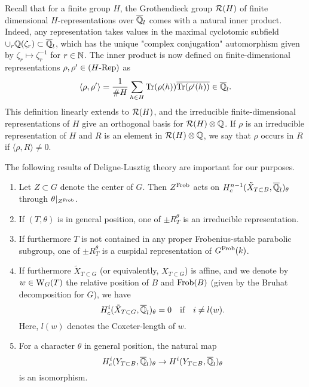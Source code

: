 \documentclass[../main.tex]{subfiles}
\begin{document}
Recall that for a finite group $H$, the Grothendieck group $\mathcal{R}(H)$ of finite 
dimensional $H$-representations over $\overline {\mathbb{Q}}_l$ comes with a natural inner
product. Indeed, any representation takes values in the maximal cyclotomic
subfield $\cup_{r} \mathbb{Q}(\zeta_r) \subset \overline {\mathbb{Q}}_l$, which has the unique 
"complex conjugation" automorphism given by $\zeta_r \mapsto \zeta_r^{-1}$ for 
$r \in \mathbb{N}$. 
The inner product is now defined on finite-dimensional representations $\rho,
\rho' \in {({H}\text-\allowbreak\mathrm{Rep})}$ as
\begin{equation*}
  \langle \rho, \rho' \rangle = \frac 1 {\# H} \sum_{h \in H} \operatorname{Tr}(\rho(h)) \overline {\operatorname{Tr} (\rho'(h))} \in \overline {\mathbb{Q}}_l.
\end{equation*}
This definition linearly extends to $\mathcal{R}(H)$, and the irreducible
finite-dimensional representations of $H$ give an orthogonal basis for $\mathcal{R}(H)
\otimes \mathbb{Q}$. If $\rho$ is an irreducible representation of $H$ and 
$R$ is an element in $\mathcal{R}(H) \otimes \mathbb{Q}$, we say that $\rho$ occurs in $R$ if 
$\langle \rho, R\rangle \neq 0$.

The following results of Deligne-Lusztig theory are important for our purposes.

\begin{thm}\label{thm:DLTheoryGeneralResults}
  \leavevmode
  \begin{enumerate}
      \item \textnormal{\cite[Corollary 1.22]{delignelusztig1976}} Let $Z \subset G$
        denote the center of $G$. Then $Z^{\mathrm{Frob}}$ acts on $H^{n-1}_c(\tilde
        X_{T \subset B}, \overline {\mathbb{Q}}_l)_{\theta}$ through $\theta|_{Z^{\mathrm{Frob}}}$.
      \item \textnormal{\cite[Corollary 7.3]{delignelusztig1976}} If 
        $(T, \theta)$ is in general position, one of $\pm R_T^\theta$ is an 
        irreducible representation.
      \item \textnormal{\cite[Corollary 8.3]{delignelusztig1976}} If furthermore
        $T$ is not contained in any proper Frobenius-stable parabolic subgroup,
        one of $\pm R^\theta_T$ is a cuspidal representation of $G^{\mathrm{Frob}}(k)$.
      \item \textnormal{\cite[Corollary 9.9]{delignelusztig1976}} If furthermore
        $\tilde X_{T \subset G}$ (or equivalently, $X_{T \subset G}$) is affine, 
        and we denote by $w \in \mathrm W_G(T)$ the relative position of $B$ and
        $\mathrm{Frob}(B)$ (given by the Bruhat decomposition for $G$),
        we have $$H_c^i(\tilde X_{T \subset G}, \overline {\mathbb{Q}}_l)_\theta = 0 \quad \text{if}
        \quad i \neq l(w).$$
        Here, $l(w)$ denotes the Coxeter-length of $w$.
      \item \textnormal{\cite[Theorem 9.8]{delignelusztig1976}} For a character 
        $\theta$ in general position, the natural map
        \begin{equation*}
          H^i_c(Y_{T \subset B},\overline {\mathbb{Q}}_l)_\theta \to H^i(Y_{T \subset
          B}, \overline {\mathbb{Q}}_l)_\theta
        \end{equation*}
        is an isomorphism.
    \end{enumerate}
\end{thm}
\end{document}
